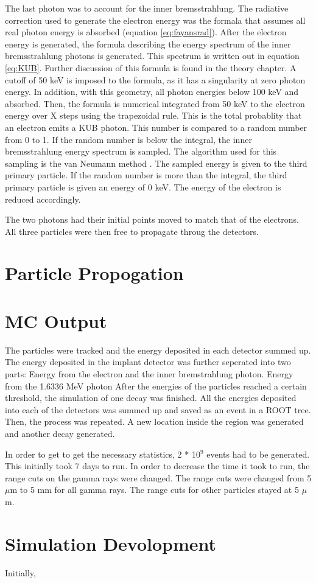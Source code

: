 The last photon was to account for the inner bremsstrahlung.
The radiative correction used to generate the electron energy was the formala that assumes all real photon energy is absorbed (equation \ref{eq:fayansrad}).
After the electron energy is generated, the formula describing the energy spectrum of the inner bremsstrahlung photons is generated. 
This spectrum is written out in equation \ref{eq:KUB}. %
Further discussion of this formula is found in the theory chapter.
A cutoff of 50 keV is imposed to the formula, as it has a singularity at zero photon energy.
In addition, with this geometry, all photon energies below 100 keV and absorbed.
Then, the formula is numerical integrated from 50 keV to the electron energy over X steps using the trapezoidal rule.
This is the total probablity that an electron emits a KUB photon.
This number is compared to a random number from 0 to 1.
If the random number is below the integral, the inner bremsstrahlung energy spectrum is sampled.
The algorithm used for this sampling is the van Neumann method \cite{neu51}.
The sampled energy is given to the third primary particle.
If the random number is more than the integral, the third primary particle is given an energy of 0 keV.
The energy of the electron is reduced accordingly.

The two photons had their initial points moved to match that of the electrons.
All three particles were then free to propagate throug the detectors.

\section{Particle Propogation}  

\section{MC Output}
The particles were tracked and the energy deposited in each detector summed up.
The energy deposited in the implant detector was further seperated into two parts:
Energy from the  electron and the inner bremstrahlung photon.
Energy from the 1.6336 MeV photon
After the energies of the particles reached a certain threshold, the simulation of one decay was finished.
All the energies deposited into each of the detectors was summed up and saved as an event in a ROOT tree.
Then, the process was repeated.
A new location inside the region was generated and another decay generated.

In order to get to get the necessary statistics, 2 * 10$^{9}$ events had to be generated. 
This initially took 7 days to run. 
In order to decrease the time it took to run, the range cuts on the gamma rays were changed.
The range cuts were changed from 5 $\mu$m to 5 mm for all gamma rays.
The range cuts for other particles stayed at 5 $\mu$m.

\section{Simulation Devolopment}
Initially,  

